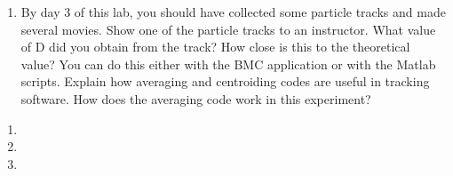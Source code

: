 \documentclass{../signatures}
\begin{document}

\begin{enumerate}

\item By day 3 of this lab, you should have collected some particle tracks and made several movies. Show one of the particle tracks to an instructor. What value of D did you obtain from the track? How close is this to the theoretical value? You can do this either with the BMC application or with the Matlab scripts. Explain how averaging and centroiding codes are useful in tracking software. How does the averaging code work in this experiment?
\\[36pt]
\end{enumerate}



\checkpointsection 

\begin{enumerate}

\item {}

\item {}

\item {}

\end{enumerate}
\end{document}
